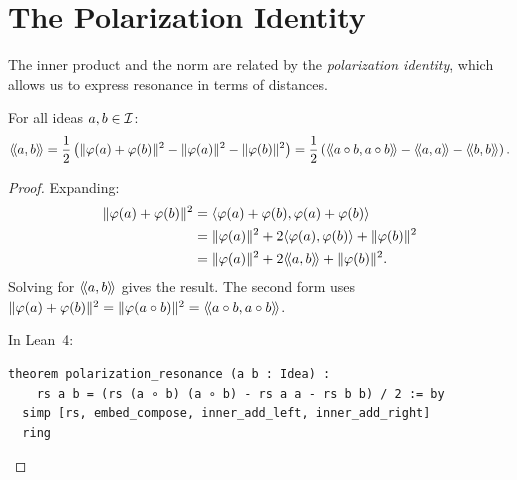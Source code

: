 \section{The Polarization Identity}

The inner product and the norm are related by the \emph{polarization identity},
which allows us to express resonance in terms of distances.

\begin{theorem}
\label{thm:polarization}
For all ideas $a, b \in \mathcal{I}$:
\[
  \rs{a}{b} = \frac{1}{2}\left(
    \nrm{\embed{a} + \embed{b}}^2 - \nrm{\embed{a}}^2 - \nrm{\embed{b}}^2
  \right)
  = \frac{1}{2}\left(
    \rs{a \compose b}{a \compose b} - \rs{a}{a} - \rs{b}{b}
  \right).
\]
\end{theorem}

\begin{proof}
Expanding:
\begin{align*}
  \lVert \varphi(a) + \varphi(b) \rVert^2
  &= \langle \varphi(a) + \varphi(b), \varphi(a) + \varphi(b) \rangle \\
  &= \lVert \varphi(a) \rVert^2 + 2\langle \varphi(a), \varphi(b) \rangle + \lVert \varphi(b) \rVert^2 \\
  &= \lVert \varphi(a) \rVert^2 + 2\langle\!\langle a, b \rangle\!\rangle + \lVert \varphi(b) \rVert^2.
\end{align*}
Solving for $\langle\!\langle a, b \rangle\!\rangle$ gives the result. The second form uses $\lVert \varphi(a)
+ \varphi(b) \rVert^2 = \lVert \varphi(a \circ b) \rVert^2 = \langle\!\langle a \circ b, a \circ
b \rangle\!\rangle$.

In Lean~4:
\begin{lstlisting}
theorem polarization_resonance (a b : Idea) :
    rs a b = (rs (a ∘ b) (a ∘ b) - rs a a - rs b b) / 2 := by
  simp [rs, embed_compose, inner_add_left, inner_add_right]
  ring
\end{lstlisting}
\end{proof}

